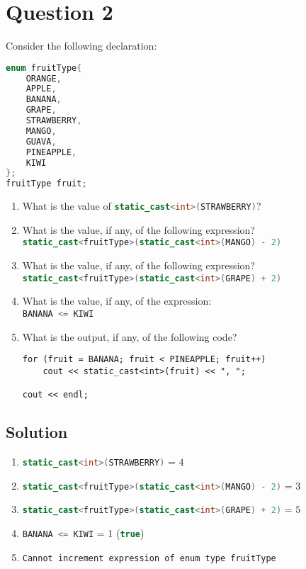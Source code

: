 \documentclass[a4paper, 10pt]{article}
\begin{document}
  \newpage
  \section{Question 2}
    Consider the following declaration:
        \begin{lstlisting}[language=c++]
enum fruitType{
    ORANGE,
    APPLE,
    BANANA,
    GRAPE,
    STRAWBERRY,
    MANGO,
    GUAVA,
    PINEAPPLE,
    KIWI
}; 
fruitType fruit;
        \end{lstlisting}
        \begin{enumerate}[label=\Alph*.]
            \item What is the value of \lstinline[language=c++]{static_cast<int>(STRAWBERRY)}?
            \item What is the value, if any, of the following expression? \\
                \lstinline[language=c++]{static_cast<fruitType>(static_cast<int>(MANGO) - 2)}
            \item What is the value, if any, of the following expression? \\
                \lstinline[language=c++]{static_cast<fruitType>(static_cast<int>(GRAPE) + 2)}
            \item What is the value, if any, of the expression: \\
                \lstinline[language=c++]{BANANA <= KIWI}
            \item What is the output, if any, of the following code?
                \begin{lstlisting}
for (fruit = BANANA; fruit < PINEAPPLE; fruit++)
    cout << static_cast<int>(fruit) << ", "; 

cout << endl;
                \end{lstlisting}
        \end{enumerate}
    \subsection{Solution}
      \begin{enumerate}[label=\alph*.]
          \item \lstinline[language=c++]{static_cast<int>(STRAWBERRY)} = $4$
          \item \lstinline[language=c++]{static_cast<fruitType>(static_cast<int>(MANGO) - 2)}
            = $3$
          \item \lstinline[language=c++]{static_cast<fruitType>(static_cast<int>(GRAPE) + 2)}
            = $5$
          \item \lstinline[language=c++]{BANANA <= KIWI} = 1 (\lstinline[language=c++]{true})
          \item \lstinline[language=bash,columns=fixed]{Cannot increment expression of enum type fruitType}
      \end{enumerate}
\end{document}

